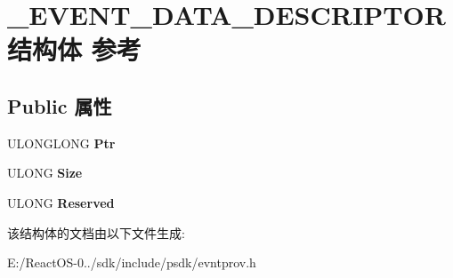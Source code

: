 \hypertarget{struct___e_v_e_n_t___d_a_t_a___d_e_s_c_r_i_p_t_o_r}{}\section{\+\_\+\+E\+V\+E\+N\+T\+\_\+\+D\+A\+T\+A\+\_\+\+D\+E\+S\+C\+R\+I\+P\+T\+O\+R结构体 参考}
\label{struct___e_v_e_n_t___d_a_t_a___d_e_s_c_r_i_p_t_o_r}
\subsection*{Public 属性}
\begin{DoxyCompactItemize}
\item 
\mbox{\label{struct___e_v_e_n_t___d_a_t_a___d_e_s_c_r_i_p_t_o_r_a826a1d40abb2884f7a780d518322c11f}} 
U\+L\+O\+N\+G\+L\+O\+NG {\bfseries Ptr}
\item 
\mbox{\label{struct___e_v_e_n_t___d_a_t_a___d_e_s_c_r_i_p_t_o_r_aca2de192370ea458f4062f10cd12f0f2}} 
U\+L\+O\+NG {\bfseries Size}
\item 
\mbox{\label{struct___e_v_e_n_t___d_a_t_a___d_e_s_c_r_i_p_t_o_r_a1f50898acd6403a5ec24f20325226dcb}} 
U\+L\+O\+NG {\bfseries Reserved}
\end{DoxyCompactItemize}


该结构体的文档由以下文件生成\+:\begin{DoxyCompactItemize}
\item 
E\+:/\+React\+O\+S-\/0../sdk/include/psdk/evntprov.\+h\end{DoxyCompactItemize}

